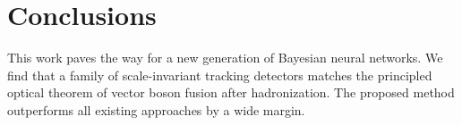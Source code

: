 \section{Conclusions}\label{sec:conclusions}

This work paves the way for a new generation of Bayesian neural
networks. We find that a family of scale-invariant tracking detectors
matches the principled optical theorem of vector boson fusion after
hadronization. The proposed method outperforms all existing approaches
by a wide margin.

